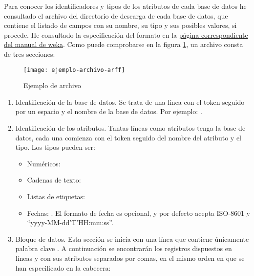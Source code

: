 Para conocer los identificadores y tipos de los atributos de cada base de datos he consultado el archivo  del directorio de descarga de cada base de datos, que contiene el listado de campos con su nombre, su tipo y sus posibles valores, si procede. He consultado la especificación del formato  en la \href{https://www.cs.waikato.ac.nz/ml/weka/arff.html}{página correspondiente del manual de weka}. Como puede comprobarse en la figura \ref{fig:ejemplo-arff}, un archivo  consta de tres secciones:
\begin{figure}[H]
    \centering
    \texttt{[image: ejemplo-archivo-arff]}
    \caption{Ejemplo de archivo }
    \label{fig:ejemplo-arff}
\end{figure}
\begin{enumerate}
    \item Identificación de la base de datos. Se trata de una línea con el token  seguido por un espacio y el nombre de la base de datos. Por ejemplo: .
    \item Identificación de los atributos. Tantas líneas como atributos tenga la base de datos, cada una comienza con el token  seguido del nombre del atributo y el tipo. Los tipos pueden ser:
        \begin{itemize}
            \item Numéricos: 
            \item Cadenas de texto: 
            \item Listas de etiquetas: 
            \item Fechas: . El formato de fecha es opcional, y por defecto acepta ISO-8601 y ``yyyy-MM-dd'T'HH:mm:ss''.
        \end{itemize}
    \item Bloque de datos. Esta sección se inicia con una línea que contiene únicamente palabra clave . A continuación se encontrarán los registros dispuestos en líneas y con sus atributos separados por comas, en el mismo orden en que se han especificado en la cabecera:
    \begin{center}
        \parbox{5.1cm}{}
    \end{center}

\end{enumerate}


